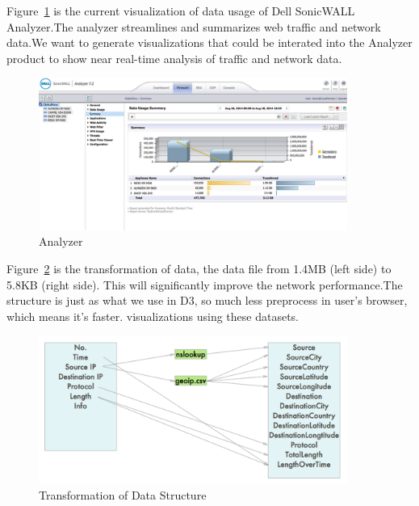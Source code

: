 \documentclass[paper=a4, fontsize=11pt]{report} %
\begin{document}
\begin{description}[style=nextline]
    \item[\href{http://www.sonicwall.com/us/en/products/Firewall-Analyzer.html}{Analyzer}]
    Figure~\ref{fig:analyzer} is the current visualization of data usage of Dell SonicWALL Analyzer.The analyzer streamlines and summarizes web traffic and network data.We want to generate visualizations that could be interated into the Analyzer product to show near real-time analysis of traffic and network data.
    \begin{figure}[H]
        \begin{center}
            \includegraphics[width=0.9\textwidth]{analyzer.png}
        \end{center}
        \caption{Analyzer}\label{fig:analyzer}
    \end{figure}

    \item[\href{http://sjengle.cs.usfca.edu/cs690-sonicwall/}{Transformation of Data}]
    Figure~\ref{fig:datastructure} is the transformation of data, the data file from 1.4MB (left side) to 5.8KB (right side). This will significantly improve the network performance.The structure is just as what we use in D3, so much less preprocess in user's browser, which means it's faster.
visualizations using these datasets.
       \begin{figure}[H]
        \begin{center}
            \includegraphics[width=0.9\textwidth]{datastructure.png}
        \end{center}
        \caption{Transformation of Data Structure}\label{fig:datastructure}
    \end{figure}


\end{description}
\end{document}
